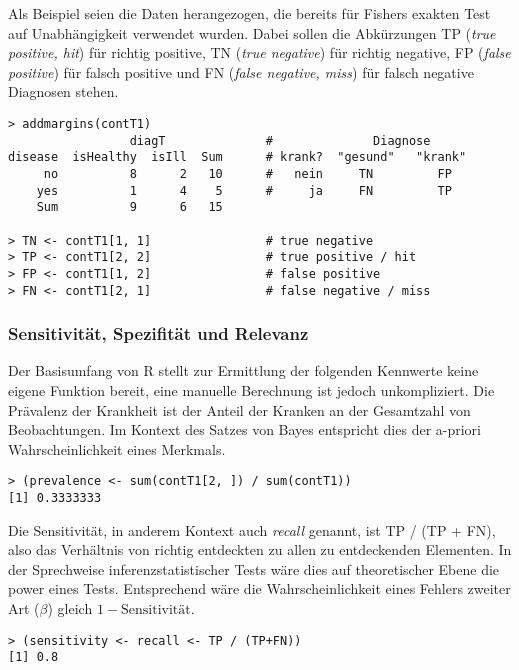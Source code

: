 Als Beispiel seien die Daten herangezogen, die bereits für Fishers exakten Test auf Unabhängigkeit verwendet wurden. Dabei sollen die Abkürzungen TP (\emph{true positive, hit}) für richtig positive, TN (\emph{true negative}) für richtig negative, FP (\emph{false positive}) für falsch positive und FN (\emph{false negative, miss}) für falsch negative Diagnosen stehen.
\begin{lstlisting}
> addmargins(contT1)
                 diagT              #              Diagnose
disease  isHealthy  isIll  Sum      # krank?  "gesund"   "krank"
     no          8      2   10      #   nein     TN         FP
    yes          1      4    5      #     ja     FN         TP
    Sum          9      6   15

> TN <- contT1[1, 1]                # true negative
> TP <- contT1[2, 2]                # true positive / hit
> FP <- contT1[1, 2]                # false positive
> FN <- contT1[2, 1]                # false negative / miss
\end{lstlisting}

\subsubsection{Sensitivität, Spezifität und Relevanz}

Der Basisumfang von R stellt zur Ermittlung der folgenden Kennwerte keine eigene Funktion bereit, eine manuelle Berechnung ist jedoch unkompliziert. Die Prävalenz der Krankheit ist der Anteil der Kranken an der Gesamtzahl von Beobachtungen. Im Kontext des Satzes von Bayes entspricht dies der a-priori Wahrscheinlichkeit eines Merkmals.
\begin{lstlisting}
> (prevalence <- sum(contT1[2, ]) / sum(contT1))
[1] 0.3333333
\end{lstlisting}

Die Sensitivität, in anderem Kontext auch \emph{recall} genannt, ist TP / (TP + FN), also das Verhältnis von richtig entdeckten zu allen zu entdeckenden Elementen. In der Sprechweise inferenzstatistischer Tests wäre dies auf theoretischer Ebene die power eines Tests. Entsprechend wäre die Wahrscheinlichkeit eines Fehlers zweiter Art ($\beta$) gleich $1-\text{Sensitivität}$.
\begin{lstlisting}
> (sensitivity <- recall <- TP / (TP+FN))
[1] 0.8
\end{lstlisting}

